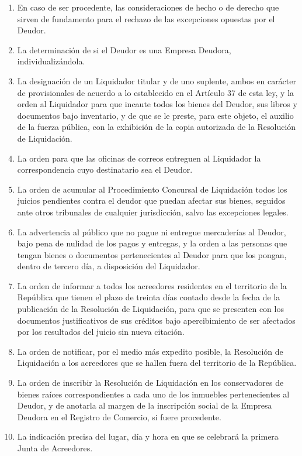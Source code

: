 \documentclass[
]{book}
\begin{document}
\begin{enumerate}
\def\labelenumi{\arabic{enumi})}
\item
  En caso de ser procedente, las consideraciones de hecho o de derecho que sirven de fundamento para el rechazo de las excepciones opuestas por el Deudor.
\item
  La determinación de si el Deudor es una Empresa Deudora, individualizándola.
\item
  La designación de un Liquidador titular y de uno suplente, ambos en carácter de provisionales de acuerdo a lo establecido en el Artículo 37 de esta ley, y la orden al Liquidador para que incaute todos los bienes del Deudor, sus libros y documentos bajo inventario, y de que se le preste, para este objeto, el auxilio de la fuerza pública, con la exhibición de la copia autorizada de la Resolución de Liquidación.
\item
  La orden para que las oficinas de correos entreguen al Liquidador la correspondencia cuyo destinatario sea el Deudor.
\item
  La orden de acumular al Procedimiento Concursal de Liquidación todos los juicios pendientes contra el deudor que puedan afectar sus bienes, seguidos ante otros tribunales de cualquier jurisdicción, salvo las excepciones legales.
\item
  La advertencia al público que no pague ni entregue mercaderías al Deudor, bajo pena de nulidad de los pagos y entregas, y la orden a las personas que tengan bienes o documentos pertenecientes al Deudor para que los pongan, dentro de tercero día, a disposición del Liquidador.
\item
  La orden de informar a todos los acreedores residentes en el territorio de la República que tienen el plazo de treinta días contado desde la fecha de la publicación de la Resolución de Liquidación, para que se presenten con los documentos justificativos de sus créditos bajo apercibimiento de ser afectados por los resultados del juicio sin nueva citación.
\item
  La orden de notificar, por el medio más expedito posible, la Resolución de Liquidación a los acreedores que se hallen fuera del territorio de la República.
\item
  La orden de inscribir la Resolución de Liquidación en los conservadores de bienes raíces correspondientes a cada uno de los inmuebles pertenecientes al Deudor, y de anotarla al margen de la inscripción social de la Empresa Deudora en el Registro de Comercio, si fuere procedente.
\item
  La indicación precisa del lugar, día y hora en que se celebrará la primera Junta de Acreedores.
\end{enumerate}
\end{document}
